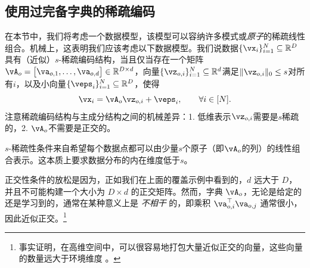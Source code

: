 \documentclass[../../book-main_zh.tex]{subfiles}
\begin{document}


\subsection{使用过完备字典的稀疏编码}

在本节中，我们将考虑一个数据模型，该模型可以容纳许多模式或\textit{原子}的稀疏线性组合。机械上，这表明我们应该考虑以下数据模型。我们说数据\(\{\vx_{i}\}_{i = 1}^{N} \subseteq \R^{D}\)具有（近似）\(s\)-稀疏编码结构，当且仅当存在一个矩阵\(\vA_{o} = \mat{\va_{o, 1}, \dots, \va_{o, d}} \in \R^{D \times d}\)，向量\(\{\vz_{o, i}\}_{i = 1}^{N} \subseteq \R^{d}\)满足\(\norm{\vz_{o, i}}_{0} \leq s\)对所有\(i\)，以及小向量\(\{\veps_{i}\}_{i = 1}^{N} \subseteq \R^{D}\)，使得
\begin{equation}\label{eq:vectorized_sparse_dl_dgp}
    \vx_{i} = \vA_{o}\vz_{o, i} + \veps_{i}, \qquad \forall i \in [N].
\end{equation}
注意稀疏编码结构与主成分结构之间的机械差异：1. 低维表示\(\vz_{o, i}\)需要是\(s\)稀疏的，2. \(\vA_{o}\)不需要是正交的。

\(s\)-稀疏性条件来自希望每个数据点都可以由少量\(s\)个原子（即\(\vA_o\)的列）的线性组合表示。这本质上要求数据分布的内在维度低于\(s\)。

正交性条件的放松是因为，正如我们在上面的覆盖示例中看到的，\(d\) 远大于 \(D\)，并且不可能构建一个大小为 \(D \times d\) 的正交矩阵。然而，字典 \(\vA_{o}\)，无论是给定的还是学习到的，通常在某种意义上是 \textit{不相干} 的，即乘积 \(\va_{o, i}^{\top}\va_{o, j}\) 通常很小，因此近似正交。\footnote{事实证明，在高维空间中，可以很容易地打包大量近似正交的向量，这些向量的数量远大于环境维度 \cite{Wright-Ma-2022}。}
\end{document}
